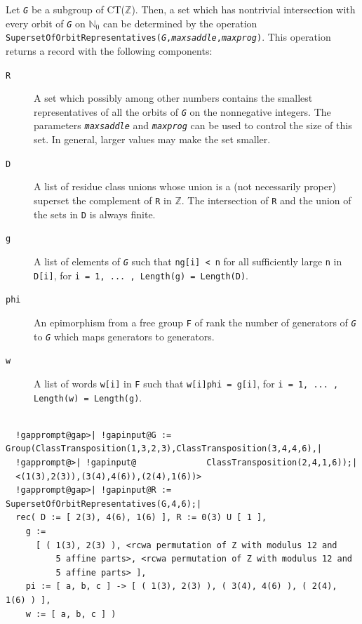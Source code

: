 \documentclass[a4paper,11pt]{report}
\begin{document}
{{\begin{Verbatim}[commandchars=!@|,fontsize=\small,frame=single,label=Example]
\end{Verbatim}
  Let \mbox{\texttt{\mdseries\slshape G}} be a subgroup of CT({\ensuremath{\mathbb Z}}). Then, a set which has
nontrivial intersection with every orbit of \mbox{\texttt{\mdseries\slshape G}} on ${\ensuremath{\mathbb N}}_0$ can be determined by the operation \texttt{SupersetOfOrbitRepresentatives(\mbox{\texttt{\mdseries\slshape G}},\mbox{\texttt{\mdseries\slshape maxsaddle}},\mbox{\texttt{\mdseries\slshape maxprog}})}. This operation returns a record with the following components: 
\begin{description}
\item[{\texttt{R}}]  A set which \texttt{}\texttt{} possibly among other
numbers \texttt{}\texttt{} contains the smallest
representatives of all the orbits of \mbox{\texttt{\mdseries\slshape G}} on the nonnegative integers. The parameters \mbox{\texttt{\mdseries\slshape maxsaddle}} and \mbox{\texttt{\mdseries\slshape maxprog}} can be used to control the size of this set. In general, larger values may
make the set smaller. 
\item[{\texttt{D}}]  A list of residue class unions whose union is a (not necessarily proper)
superset the complement of \texttt{R} in {\ensuremath{\mathbb Z}}. The intersection of \texttt{R} and the union of the sets in \texttt{D} is always finite. 
\item[{\texttt{g}}]  A list of elements of \mbox{\texttt{\mdseries\slshape G}} such that \texttt{n\texttt{}g[i] {\textless} n} for all sufficiently large \texttt{n} in \texttt{D[i]}, for \texttt{i = 1, ... , Length(g) = Length(D)}. 
\item[{\texttt{phi}}]  An epimorphism from a free group \texttt{F} of rank the number of generators of \mbox{\texttt{\mdseries\slshape G}} to \mbox{\texttt{\mdseries\slshape G}} which maps generators to generators. 
\item[{\texttt{w}}]  A list of words \texttt{w[i]} in \texttt{F} such that \texttt{w[i]\texttt{}phi = g[i]}, for \texttt{i = 1, ... , Length(w) = Length(g)}. 
\end{description}
 
\begin{Verbatim}[commandchars=!@|,fontsize=\small,frame=single,label=Example]
  
  !gapprompt@gap>| !gapinput@G := Group(ClassTransposition(1,3,2,3),ClassTransposition(3,4,4,6),|
  !gapprompt@>| !gapinput@              ClassTransposition(2,4,1,6));|
  <(1(3),2(3)),(3(4),4(6)),(2(4),1(6))>
  !gapprompt@gap>| !gapinput@R := SupersetOfOrbitRepresentatives(G,4,6);|
  rec( D := [ 2(3), 4(6), 1(6) ], R := 0(3) U [ 1 ], 
    g := 
      [ ( 1(3), 2(3) ), <rcwa permutation of Z with modulus 12 and 
          5 affine parts>, <rcwa permutation of Z with modulus 12 and 
          5 affine parts> ], 
    pi := [ a, b, c ] -> [ ( 1(3), 2(3) ), ( 3(4), 4(6) ), ( 2(4), 1(6) ) ], 
    w := [ a, b, c ] )
  

\end{Verbatim}}}
\end{document}
